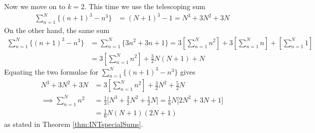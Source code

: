 \begin{eg}
Now we move on to $k=2$. This time we use the telescoping sum
\begin{align*}
\sum_{n=1}^N \big\{(n+1)^3 -n^3\big\} &= (N+1)^3 -1 = N^3 + 3N^2 +3N
\end{align*}  
On the other hand, the same sum
\begin{align*}
\sum_{n=1}^N \big\{(n+1)^3 -n^3\big\} &= \sum_{n=1}^N \big\{3n^2 + 3n+1\big\} 
                                       = 3\left[\sum_{n=1}^N n^2\right] + 
                                         3\left[\sum_{n=1}^N n\right] +
                                         \left[\sum_{n=1}^N 1\right] \\
                                      &= 3\left[\sum_{n=1}^N n^2\right] + \tfrac{3}{2}N(N+1) + N
\end{align*}  
Equating the two formulae for $\sum_{n=1}^N \big\{(n+1)^3 -n^3\big\}$ gives
\begin{align*}
N^3 + 3N^2 +3N &= 3\left[\sum_{n=1}^N n^2\right] + \tfrac{3}{2}N^2 +\tfrac{5}{2}N\\
\implies \sum_{n=1}^N n^2 &= \tfrac{1}{3}\Big[N^3 + \tfrac{3}{2}N^2 +\tfrac{1}{2}N\Big] 
                           =\tfrac{1}{6}N\Big[2N^2+3N+1\Big] \\
                         &=\tfrac{1}{6}N(N+1)(2N+1)
\end{align*}  
as stated in Theorem \ref{thm:INTspecialSums}.


\end{eg}
